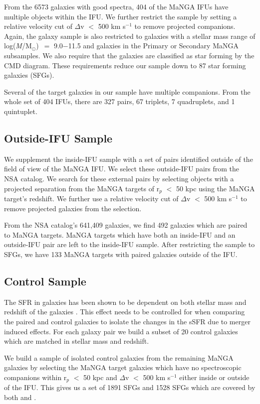 \documentclass[iop,revtex4,twocolumn,apj,numberedappendix,appendixfloats]{emulateapj}
\newcommand{\logm}{log({\it M}/M$_{\odot}$)}
\begin{document}
From the 6573 galaxies with good spectra, 404 of the MaNGA IFUs have multiple objects within the IFU. We further restrict the sample by setting a relative velocity cut of $\Delta$v $<$ 500 km s$^{-1}$ to remove projected companions. Again, the galaxy sample is also restricted to galaxies with a stellar mass range of \logm\ $=$ 9.0$-$11.5 and galaxies in the Primary or Secondary MaNGA subsamples. We also require that the galaxies are classified as star forming by the CMD diagram. These requirements reduce our sample down to 87 star forming galaxies (SFGs). 

Several of the target galaxies in our sample have multiple companions. From the whole set of 404 IFUs, there are 327 pairs, 67 triplets, 7 quadruplets, and 1 quintuplet. 

\subsection{Outside-IFU Sample}\label{sec:outside}

We supplement the inside-IFU sample with a set of pairs identified outside of the field of view of the MaNGA IFU. We select these outside-IFU pairs from the NSA catalog. We search for these external pairs by selecting objects with a projected separation from the MaNGA targets of r$_p$ $<$ 50 kpc using the MaNGA target's redshift. We further use a relative velocity cut of $\Delta$v $<$ 500 km s$^{-1}$ to remove projected galaxies from the selection. 

From the NSA catalog's 641,409 galaxies, we find 492 galaxies which are paired to MaNGA targets. MaNGA targets which have both an inside-IFU and an outside-IFU pair are left to the inside-IFU sample. After restricting the sample to SFGs, we have 133 MaNGA targets with paired galaxies outside of the IFU. 

\subsection{Control Sample}\label{sec:control}

The SFR in galaxies has been shown to be dependent on both stellar mass and redshift of the galaxies \citep{Noeske:2007}. This effect needs to be controlled for when comparing the paired and control galaxies to isolate the changes in the sSFR due to merger induced effects. For each galaxy pair we build a subset of 20 control galaxies which are matched in stellar mass and redshift. 

We build a sample of isolated control galaxies from the remaining MaNGA galaxies by selecting the MaNGA target galaxies which have no spectroscopic companions within r$_p$ $<$ 50 kpc and $\Delta$v $<$ 500 km s$^{-1}$ either inside or outside of the IFU. This gives us a set of 1891 SFGs and 1528 SFGs which are covered by both \citet{Simard:2011} and \citet{Mendel:2014}. 
\end{document}
